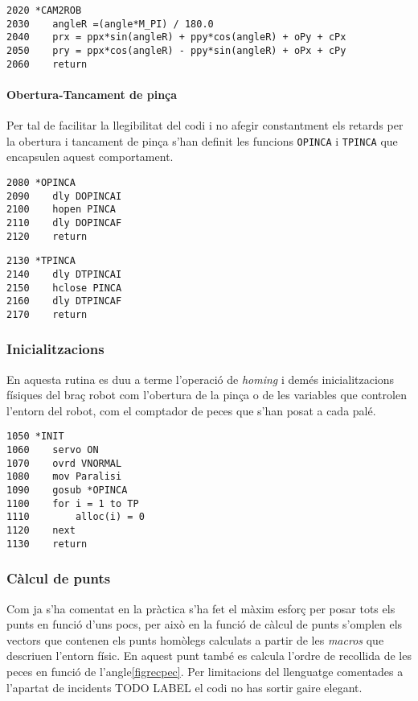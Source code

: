 \begin{verbatim}
2020 *CAM2ROB
2030 	angleR =(angle*M_PI) / 180.0
2040    prx = ppx*sin(angleR) + ppy*cos(angleR) + oPy + cPx
2050    pry = ppx*cos(angleR) - ppy*sin(angleR) + oPx + cPy
2060    return
\end{verbatim}

\paragraph{Obertura-Tancament de pinça}
Per tal de facilitar la llegibilitat del codi i no afegir constantment
els retards per la obertura i tancament de pinça s'han definit les funcions
\texttt{OPINCA} i \texttt{TPINCA} que encapsulen aquest comportament.

\begin{verbatim}
2080 *OPINCA
2090    dly DOPINCAI
2100    hopen PINCA
2110    dly DOPINCAF
2120    return
\end{verbatim}
\begin{verbatim}
2130 *TPINCA
2140    dly DTPINCAI
2150    hclose PINCA
2160    dly DTPINCAF
2170    return
\end{verbatim}

\subsubsection{Inicialitzacions}
En aquesta rutina es duu a terme l'operació de \emph{homing} i demés
inicialitzacions físiques del braç robot com l'obertura de la pinça
o de les variables que controlen l'entorn del robot, com el 
comptador de peces que s'han posat a cada palé.

\begin{verbatim}
1050 *INIT
1060    servo ON
1070    ovrd VNORMAL
1080    mov Paralisi
1090    gosub *OPINCA
1100    for i = 1 to TP
1110        alloc(i) = 0
1120    next
1130    return
\end{verbatim}

\subsubsection{Càlcul de punts}\label{codcalcpts}
Com ja s'ha comentat en la pràctica s'ha fet el màxim esforç per posar tots els
punts en funció d'uns pocs, per això en la funció de càlcul de punts s'omplen
els vectors que contenen els punts homòlegs calculats a partir de les
\emph{macros} que descriuen l'entorn físic. En aquest punt també es calcula
l'ordre de recollida de les peces en funció de l'angle\ref{figrecpec}. Per limitacions del
llenguatge comentades a l'apartat de incidents TODO LABEL el codi no has
sortir gaire elegant.

